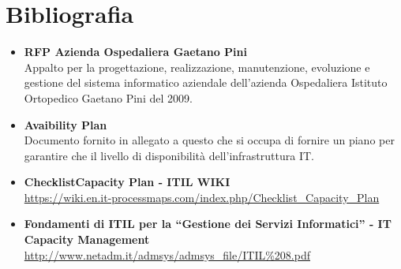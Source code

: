 \newpage

\section{Bibliografia} \label{ref:bibliografia}
\begin{itemize}
	\item \textbf {RFP Azienda Ospedaliera Gaetano Pini} \\
	Appalto per la progettazione, realizzazione, manutenzione, evoluzione e gestione del sistema informatico aziendale dell'azienda Ospedaliera Istituto Ortopedico Gaetano Pini del 2009.\\
	\item \textbf {Avaibility Plan}\\
	Documento fornito in allegato a questo che si occupa di fornire un piano per garantire che il livello di disponibilità dell'infrastruttura IT.\\
	\item \textbf {ChecklistCapacity Plan - ITIL WIKI}\\
	\url{https://wiki.en.it-processmaps.com/index.php/Checklist_Capacity_Plan}\\
	\item \textbf {Fondamenti di ITIL per la “Gestione dei Servizi Informatici” - IT Capacity Management}\\
	\url{http://www.netadm.it/admsys/admsys_file/ITIL%208.pdf}
\end{itemize}
